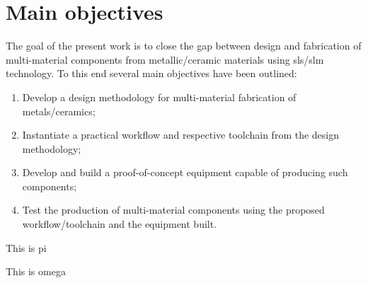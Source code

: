 %
\section{Main objectives}
The goal of the present work is to close the gap between design and fabrication of
multi-material components from metallic/ceramic materials using
\gls{sls}/\gls{slm} technology. To this end several main objectives have been
outlined:
\begin{enumerate}
  \item Develop a design methodology for multi-material fabrication of
    metals/ceramics;
  \item Instantiate a practical workflow and respective toolchain from the
    design methodology;
  \item Develop and build a proof-of-concept equipment capable of producing
    such components;
  \item Test the production of multi-material components using the proposed
    workflow/toolchain and the equipment built.
  \end{enumerate}

  This is \gls{pi}
  
  This is \gls{omega}
